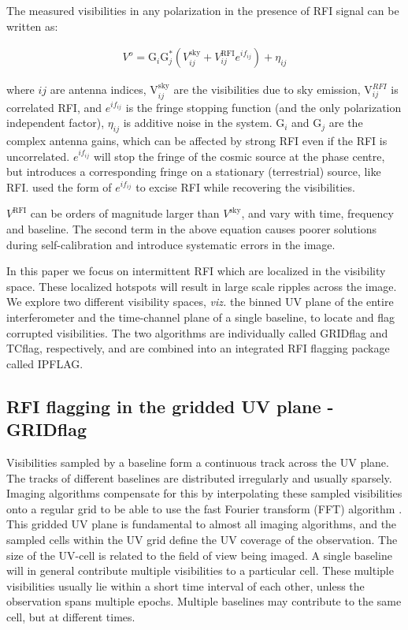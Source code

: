 \documentclass[twocolumn]{aastex61}
\begin{document}
{The measured visibilities in any polarization in the presence of
RFI signal can be written as:

\begin{align}
   V^o = \text{G}_i   \text{G}_j^* (V^\text{sky}_{ij}
   + V^\text{RFI}_{ij}e^{if_{ij}})
   + \eta_{ij}
\end{align}

\noindent
where $ij$ are antenna indices, $\text{V}_{ij}^\text{sky}$ are the visibilities
due to sky emission, $\text{V}_{ij}^{RFI}$ is correlated RFI, and
$e^{if_{ij}}$ is the fringe stopping function (and the only
polarization independent factor), $\eta_{ij}$ is additive noise in the system.
$\text{G}_i$ and $\text{G}_j$ are the complex antenna gains, which can be
affected by strong RFI  even if the RFI is uncorrelated.  $e^{if_{ij}}$ will
stop the fringe of the cosmic source at the phase centre, but introduces
a corresponding fringe on a stationary (terrestrial) source, like RFI.
\citet{athreya_new_2009} used the form of $e^{if_{ij}}$ to excise RFI while
recovering the visibilities.

$V^\text{RFI}$ can be orders of magnitude larger than $V^\text{sky}$, and vary
with time, frequency and baseline. The second term in the above
equation causes poorer solutions during self-calibration and introduce
systematic errors in the image.

In this paper we focus on intermittent RFI which are localized in the
visibility space.  These localized hotspots will result in large scale ripples
across the image. We explore two different visibility spaces,
\emph{viz.} the binned UV plane of the entire interferometer and the
time-channel plane of a single baseline, to locate and flag corrupted
visibilities. The two algorithms are individually called GRIDflag and TCflag,
respectively, and are combined into an integrated RFI flagging package called
IPFLAG.

\subsection{RFI flagging in the gridded UV plane - GRIDflag}

Visibilities sampled by a baseline form a continuous track across the UV plane.
The tracks of different baselines are distributed irregularly and usually
sparsely. Imaging algorithms compensate for this by interpolating these sampled
visibilities onto a regular grid to be able to use the fast Fourier transform
(FFT) algorithm \citep{thompson2001interferometry}. This gridded UV plane is
fundamental to almost all imaging algorithms, and the sampled cells within the
UV grid define the UV coverage of the observation. The size of the UV-cell is
related to the field of view being imaged.  A single baseline will in general
contribute multiple visibilities to a particular cell.  These multiple
visibilities usually lie within a short time interval of each other, unless the
observation spans multiple epochs.  Multiple baselines may contribute to the
same cell, but at different times.

}
\end{document}
